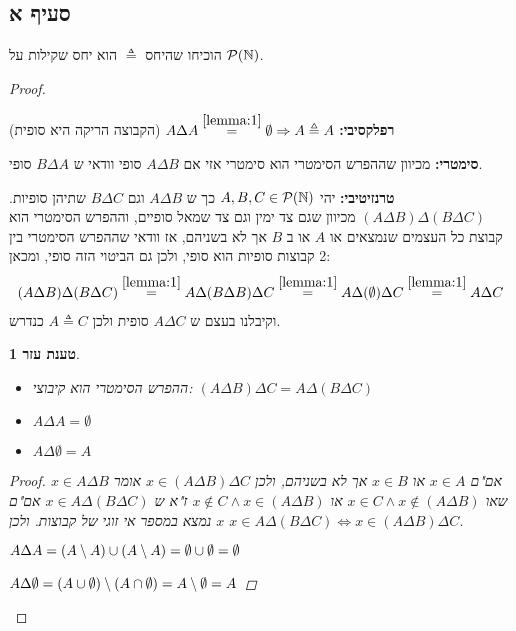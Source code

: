 \documentclass{article}
\newtheorem{lemma}[theorem]{טענת עזר}
\begin{document}
	\subsection*{סעיף א}
	הוכיחו שהיחס $\triangleq$ הוא יחס שקילות על $\mathcal{P}(\mathbb{N})$.
	\begin{proof} \nl
		\begin{itemize}
			\item[א.] \textbf{רפלקסיבי:} $A \Delta A \overset{\ref{lemma:1}}= \emptyset \Rightarrow A \triangleq A$ (הקבוצה הריקה היא סופית)
			\item[ב.] \textbf{סימטרי:} מכיוון שההפרש הסימטרי הוא סימטרי אזי אם $A \Delta B$ סופי וודאי ש $B \Delta A$ סופי.
			\item[ג.] \textbf{טרנזיטיבי:} יהי $A, B, C \in \mathcal{P}(\mathbb{N})$ כך ש $A \Delta B$ וגם $B \Delta C$ שתיהן סופיות.
			$(A \Delta B) \Delta (B \Delta C)$ מכיוון שגם צד ימין וגם צד שמאל סופיים, וההפרש הסימטרי הוא קבוצת כל העצמים שנמצאים או $A$ או ב $B$ אך לא בשניהם, אז וודאי שההפרש הסימטרי בין 2 קבוצות סופיות הוא סופי, ולכן גם הביטוי הזה סופי, ומכאן:
			\begin{align*}
				(A \Delta B) \Delta (B \Delta C) \overset{\ref{lemma:1}}=
				A \Delta (B \Delta B) \Delta C \overset{\ref{lemma:1}} =
				A \Delta (\emptyset) \Delta C \overset{\ref{lemma:1}} =
				A \Delta C
			\end{align*}
			וקיבלנו בעצם ש $A \Delta C$ סופית ולכן $A \triangleq C$ כנדרש.
			\begin{lemma} \label{lemma:1}
				\begin{itemize}
					\item[א.] ההפרש הסימטרי הוא קיבוצי: $(A \Delta B) \Delta C = A \Delta (B \Delta C)$
					\item[ב.] $A \Delta A = \emptyset$
					\item[ג.] $A \Delta \emptyset = A$
				\end{itemize}
				\begin{proof}
					\item[א.] $x \in A \Delta B$ אם"ם $x \in A$ או $x \in B$ אך לא בשניהם, ולכן $x \in (A \Delta B) \Delta C$ אומר שאו $x \in C \land x \not\in (A \Delta B)$ או $x \not\in C \land x \in (A \Delta B)$ ז"א ש $x \in A \Delta (B \Delta C)$ אם"ם $x$ נמצא במספר אי זוגי של קבוצות.
					ולכן $x \in A \Delta (B \Delta C) \iff x \in (A \Delta B) \Delta C$.
					\item[ב.] $A \Delta A = (A \setminus A) \cup (A \setminus A) = \emptyset \cup \emptyset = \emptyset$
					\item[ג.] $A \Delta \emptyset = (A \cup \emptyset) \setminus (A \cap \emptyset) = A \setminus \emptyset = A$
				\end{proof}

			\end{lemma}
		\end{itemize}
	\end{proof}
\end{document}
